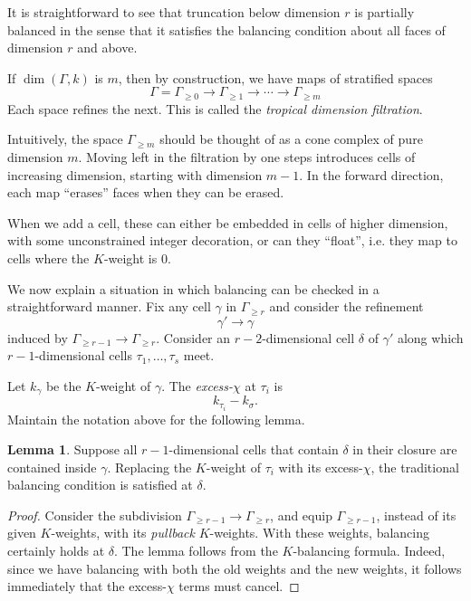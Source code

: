 \documentclass[11pt]{amsart}
\theoremstyle{definition}
\theoremstyle{definition}
\newtheorem{lemma}[theorem]{Lemma}
\begin{document}
It is straightforward to see that truncation below dimension $r$ is partially balanced in the sense that it satisfies the balancing condition about all faces of dimension $r$ and above. 

If $\dim (\Gamma,k)$ is $m$, then by construction, we have maps of stratified spaces
\[
\Gamma = \Gamma_{\geq 0}\to \Gamma_{\geq 1}\to\cdots\to\Gamma_{\geq m}
\]
Each space refines the next. This is called the {\it tropical dimension filtration}. 

Intuitively, the space $\Gamma_{\geq m}$ should be thought of as a cone complex of pure dimension $m$. Moving left in the filtration by one steps introduces cells of increasing dimension, starting with dimension $m-1$. In the forward direction, each map ``erases'' faces when they can be erased. 

When we add a cell, these can either be embedded in cells of higher dimension, with some unconstrained integer decoration, or can they ``float'', i.e. they map to cells where the $K$-weight is $0$. 


We now explain a situation in which balancing can be checked in a straightforward manner. Fix any cell $\gamma$ in $\Gamma_{\geq r}$ and consider the refinement
\[
\gamma'\to \gamma
\]
induced by $\Gamma_{\geq r-1}\to\Gamma_{\geq r}$. Consider an $r-2$-dimensional cell $\delta$ of $\gamma'$ along which $r-1$-dimensional cells $\tau_1,\ldots,\tau_s$ meet.

Let $k_\gamma$ be the $K$-weight of $\gamma$. The {\it excess-$\chi$} at $\tau_i$ is 
\[
k_{\tau_i}-k_\sigma. 
\]
Maintain the notation above for the following lemma. 

\begin{lemma}
Suppose all $r-1$-dimensional cells that contain $\delta$ in their closure are contained inside $\gamma$. Replacing the $K$-weight of $\tau_i$ with its excess-$\chi$, the traditional balancing condition is satisfied at $\delta$. 
\end{lemma}

\begin{proof}
Consider the subdivision $\Gamma_{\geq r-1}\to\Gamma_{\geq r}$, and equip $\Gamma_{\geq r-1}$, instead of its given $K$-weights, with its {\it pullback} $K$-weights. With these weights, balancing certainly holds at $\delta$. The lemma follows from the $K$-balancing formula. Indeed, since we have balancing with both the old weights and the new weights, it follows immediately that the excess-$\chi$ terms must cancel. 
\end{proof}
\end{document}
